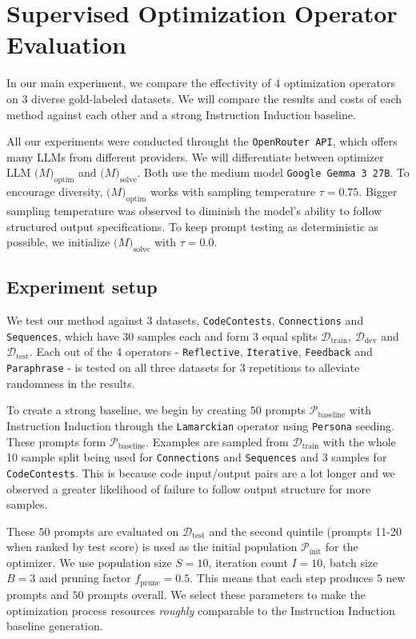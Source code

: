 \section{Supervised Optimization Operator Evaluation}
In our main experiment, we compare the effectivity of 4 optimization operators on 3 diverse gold-labeled datasets.
We will compare the results and costs of each method against each other and a strong Instruction Induction baseline.

All our experiments were conducted throught the \texttt{OpenRouter API}, which offers many LLMs from different providers.
We will differentiate between optimizer LLM $\mathcal(M)_{\text{optim}}$ and $\mathcal(M)_{\text{solve}}$.
Both use the medium model \texttt{Google Gemma 3 27B}\cite{gemmateam2025gemma3technicalreport}. 
To encourage diversity, $\mathcal(M)_{\text{optim}}$ works with sampling temperature $\tau = 0.75$. 
Bigger sampling temperature was observed to diminish the model's ability to follow structured output specifications.
To keep prompt testing as deterministic as possible, we initialize $\mathcal(M)_{\text{solve}}$ with $\tau = 0.0$.


\subsection{Experiment setup}
We test our method against 3 datasets, \texttt{CodeContests}, \texttt{Connections}  and \texttt{Sequences}, which have 30 samples each 
and form 3 equal splits $\mathcal{D}_{\text{train}}$, $\mathcal{D}_{\text{dev}}$ and $\mathcal{D}_{\text{test}}$. Each out of the 4 operators - \texttt{Reflective}, \texttt{Iterative}, \texttt{Feedback} and \texttt{Paraphrase} - is tested on all three datasets for 3 repetitions
to alleviate randomness in the results.

To create a strong baseline, we begin by creating $50$ prompts $\mathcal{P}_{\text{baseline}}$ with Instruction Induction through the \texttt{Lamarckian} operator 
using \texttt{Persona}\cite{ge2024scalingsyntheticdatacreation} seeding. These prompts form $\mathcal{P}_{\text{baseline}}$. Examples are sampled from $\mathcal{D}_{\text{train}}$ with the whole 10 sample split being used for \texttt{Connections} and \texttt{Sequences}
and 3 samples for \texttt{CodeContests}. This is because code input/output pairs are a lot longer and we observed a greater likelihood of failure to follow output structure for more samples.

These $50$ prompts are evaluated on $\mathcal{D}_{\text{test}}$ and the second quintile (prompts 11-20 when ranked by test score) is used as the initial population $\mathcal{P}_{\text{init}}$ for the optimizer.
We use population size $S=10$, iteration count $I=10$, batch size $B=3$ and pruning factor $f_{\text{prune}} = 0.5$. This means that each step produces $5$ new prompts and $50$ prompts overall.
We select these parameters to make the optimization process resources \textit{roughly} comparable to the Instruction Induction baseline generation.


